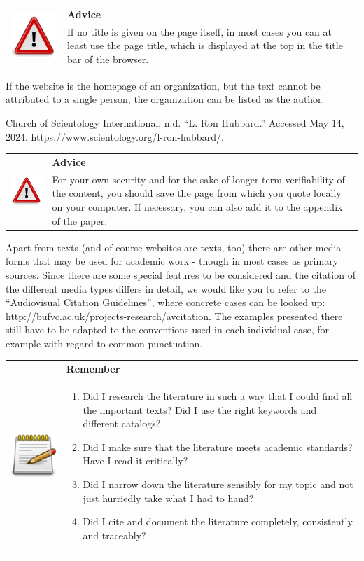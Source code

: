 \documentclass[
  english,
]{scrreprt}
\newlength{\iconwidth}
\newenvironment{displaybox}[2]{%
    \begin{center}
        \setlength\arrayrulewidth{0.75pt}%
        \arrayrulecolor{white}%
        \renewcommand{\arraystretch}{1.3}%
        \begin{tabular}{p{\iconwidth}p{\linewidth-4\tabcolsep-\iconwidth}}
            \multirow{2}{*}{#2}&\cellcolor{boxheadcol}\textbf{\sffamily\color{white}#1} \\%
            \hhline{~-}%
            &\cellcolor{boxcol}%
}{%
            \\
        \end{tabular}
        \arrayrulecolor{black}
    \end{center}
}
\newenvironment{Advice}{%
\begin{displaybox}{Advice}{\includegraphics[width=\iconwidth]{images/icon-hinweis}}}%
{\end{displaybox}}
\newenvironment{Remember}{%
\begin{displaybox}{Remember}{\includegraphics[width=\iconwidth]{images/icon-merke}}}%
{\end{displaybox}}
\begin{document}
\begin{Advice}

If no title is given on the page itself, in most cases you can at least use the page title, which is displayed at the top in the title bar of the browser.

\end{Advice}

If the website is the homepage of an organization, but the text cannot be attributed to a single person, the organization can be listed as the author:

Church of Scientology International. n.d. “L. Ron Hubbard.” Accessed May 14, 2024. https://www.scientology.org/l-ron-hubbard/.

\begin{Advice}

For your own security and for the sake of longer-term verifiability of the content, you should save the page from which you quote locally on your computer. If necessary, you can also add it to the appendix of the paper.

\end{Advice}

Apart from texts (and of course websites are texts, too) there are other media forms that may be used for academic work - though in most cases as primary sources. Since there are some special features to be considered and the citation of the different media types differs in detail, we would like you to refer to the “Audiovisual Citation Guidelines”, where concrete cases can be looked up: \url{http://bufvc.ac.uk/projects-research/avcitation}. The examples presented there still have to be adapted to the conventions used in each individual case, for example with regard to common punctuation.

\begin{Remember}

\begin{enumerate}
\def\labelenumi{\arabic{enumi}.}
\item
  Did I research the literature in such a way that I could find all the important texts? Did I use the right keywords and different catalogs?
\item
  Did I make sure that the literature meets academic standards? Have I read it critically?
\item
  Did I narrow down the literature sensibly for my topic and not just hurriedly take what I had to hand?
\item
  Did I cite and document the literature completely, consistently and traceably?
\end{enumerate}

\end{Remember}
\end{document}
